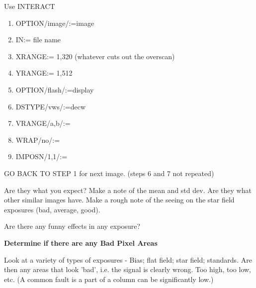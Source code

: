{{ Use INTERACT

\begin{enumerate}
                                                                               
\item OPTION/image/:=image
\item IN:=  file name
\item XRANGE:= 1,320     \hspace*{4ex}      (whatever cuts out the overscan)
\item YRANGE:= 1,512
\item OPTION/flash/:=display
\item DSTYPE/vws/:=decw
\item VRANGE/a,b/:=\hspace*{7ex}
\item WRAP/no/:=
\item IMPOSN/1,1/:=
\end{enumerate}
                                                                               
   GO BACK TO STEP 1 for next image. (steps 6 and 7 not repeated)
                                                                               
 Are they what you expect? Make a note of the mean and std dev. Are they
 what other similar images have. Make a rough note of the seeing
 on the star field exposures (bad, average, good).
                                                                               
 Are there any funny effects in any exposure?
                                                                               
{\hspace*{4ex} \bf  Determine if there are any Bad Pixel Areas}
                                                                               
 Look at a variety of types of exposures - Bias; flat field; star field;
 standards. Are then any areas that look 'bad', i.e. the signal
 is clearly wrong. Too high, too low, etc. (A common fault
 is a part of a column can be significantly low.)
                                                                               
}}
